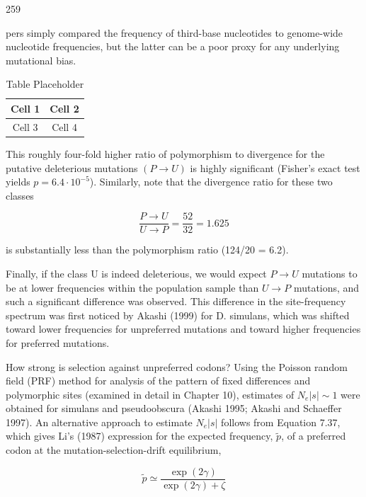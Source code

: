 \documentclass{article}
\begin{document}
259

pers simply compared the frequency of third-base nucleotides to genome-wide nucleotide frequencies, but the latter can be a poor proxy for any underlying mutational bias.

\begin{table}[h]
\centering
\begin{tabular}{|c|c|}
\hline
Cell 1 & Cell 2 \\
\hline
Cell 3 & Cell 4 \\
\hline
\end{tabular}
\caption{Table Placeholder}
\end{table}

This roughly four-fold higher ratio of polymorphism to divergence for the putative deleterious mutations  $ (P \to U) $ is highly significant (Fisher's exact test yields  $ p = 6.4 \cdot 10^{-5} $). Similarly, note that the divergence ratio for these two classes

\begin{equation}
\frac{P\rightarrow U}{U\rightarrow P}=\frac{52}{32}=1.625
\end{equation}

is substantially less than the polymorphism ratio (124/20 = 6.2).

Finally, if the class U is indeed deleterious, we would expect  $ P \rightarrow U $ mutations to be at lower frequencies within the population sample than  $ U \rightarrow P $ mutations, and such a significant difference was observed. This difference in the site-frequency spectrum was first noticed by Akashi (1999) for D. simulans, which was shifted toward lower frequencies for unpreferred mutations and toward higher frequencies for preferred mutations.

How strong is selection against unpreferred codons? Using the Poisson random field (PRF) method for analysis of the pattern of fixed differences and polymorphic sites (examined in detail in Chapter 10), estimates of  $ N_e|s| \sim 1 $ were obtained for simulans and pseudoobscura (Akashi 1995; Akashi and Schaeffer 1997). An alternative approach to estimate  $ N_e|s| $ follows from Equation 7.37, which gives Li's (1987) expression for the expected frequency,  $ \widetilde{p} $, of a preferred codon at the mutation-selection-drift equilibrium,

\begin{equation}
\widetilde{p}\simeq\frac{\exp(2\gamma)}{\exp(2\gamma)+\zeta}
\tag{8.32}
\label{eq:8_32}
\end{equation}
\end{document}
